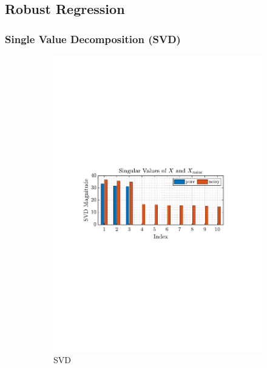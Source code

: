 \documentclass[12pt]{article}
\begin{document}
	\subsection{Robust Regression} \label{sec: 1-6-robust-regression}
 
 	\subsubsection{Single Value Decomposition (SVD)}
	\begin{figure}[H]
		\centering
		\begin{subfigure}{0.49\textwidth}
			\centering
			\includegraphics[trim={2.2cm 11.2cm 3.15cm  11.2cm}, clip, width=\textwidth]{../MATLAB/figures/q1_6a_fig01.pdf} 
			\captionsetup{justification=centering}
			\caption{SVD}
		\end{subfigure}
		\begin{subfigure}{0.49\textwidth}

\end{subfigure}
\end{figure}
\end{document}
